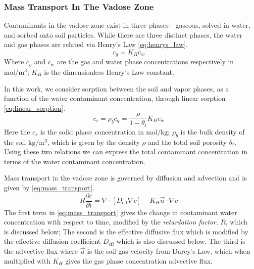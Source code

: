 \subsubsection{Mass Transport In The Vadose Zone}\label{sec:mass_transport}

Contaminants in the vadose zone exist in three phases - gaseous, solved in water, and sorbed onto soil particles.
While there are three distinct phases, the water and gas phases are related via Henry's Law \eqref{eq:henrys_law}.
\begin{equation}\label{eq:henrys_law}
  c_g = K_H c_w
\end{equation}
Where $c_g$ and $c_w$ are the gas and water phase concentrations respectively in $\mathrm{mol/m^3}$;
$K_H$ is the dimensionless Henry's Law constant.\par

In this work, we consider sorption between the soil and vapor phases, as a function of the water contaminant concentration, through linear sorption \eqref{eq:linear_sorption}.
\begin{equation}\label{eq:linear_sorption}
  c_s = \rho_b c_g = \frac{\rho}{1-\theta_t} K_H c_w
\end{equation}
Here the $c_s$ is the solid phase concentration in $\mathrm{mol/kg}$;
$\rho_b$ is the bulk density of the soil $\mathrm{kg/m^3}$, which is given by the density $\rho$ and the total soil porosity $\theta_t$.
Using these two relations we can express the total contaminant concentration in terms of the water contaminant concentration.\par

Mass transport in the vadose zone is governed by diffusion and advection and is given by \eqref{eq:mass_transport}.
\begin{equation}\label{eq:mass_transport}
  R \frac{\partial c}{\partial t} =
    \nabla \cdot[ D_\mathrm{eff} \nabla c] -
    K_H \vec{u} \cdot \nabla c
\end{equation}
The first term in \eqref{eq:mass_transport} gives the change in contaminant water concentration with respect to time, modified by the \textit{retardation factor}, $R$, which is discussed below;
The second is the effective diffusive flux which is modified by the effective diffusion coefficient $D_\mathrm{eff}$ which is also discussed below.
The third is the advective flux where $\vec{u}$ is the soil-gas velocity from Darcy's Law, which when multiplied with $K_H$ gives the gas phase concentration advective flux.\par

